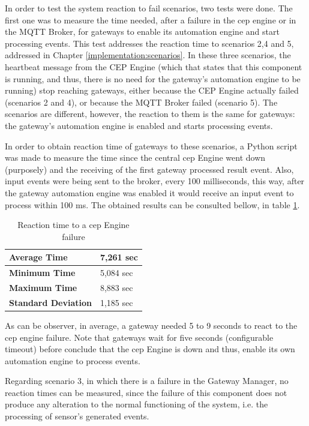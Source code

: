 In order to test the system reaction to fail scenarios, two tests were done. The first one was to measure the time needed, after a failure in the \ac{cep} engine or in the MQTT Broker, for gateways to enable its automation engine and start processing events. This test addresses the reaction time to scenarios 2,4 and 5, addressed in Chapter \ref{implementation:scenarios}. In these three scenarios, the heartbeat message from the CEP Engine (which that states that this component is running, and thus, there is no need for the gateway's automation engine to be running) stop reaching gateways, either because the CEP Engine actually failed (scenarios 2 and 4), or because the MQTT Broker failed (scenario 5). The scenarios are different, however, the reaction to them is the same for gateways: the gateway's automation engine is enabled and starts processing events. 


 In order to obtain reaction time of gateways to these scenarios, a Python script was made to measure the time since the central \ac{cep} Engine went down (purposely) and the receiving of the first gateway processed result event. Also, input events were being sent to the broker, every 100 milliseconds, this way, after the gateway automation engine was enabled it would receive an input event to process within 100 ms. The obtained results can be consulted bellow, in table \ref{cepDown}.


\begin{table}[H]
	
	\begin{tabular}{|l|l|}
		\hline
		\textbf{Average Time}       & 7,261 sec \\ \hline
		\textbf{Minimum Time}       &  5,084 sec \\ \hline
		\textbf{Maximum Time}       & 8,883 sec \\ \hline
		\textbf{Standard Deviation} & 1,185 sec \\ \hline
	\end{tabular}
	\centering
	\caption{Reaction time to a \ac{cep} Engine failure}
	\label{cepDown}
\end{table}

As can be observer, in average, a gateway needed 5 to 9 seconds to react to the \ac{cep} engine failure. Note that gateways wait for five seconds (configurable timeout) before conclude that the \ac{cep} Engine is down and thus, enable its own automation engine to process events.

Regarding scenario 3, in which there is a failure in the Gateway Manager, no reaction times can be measured, since the failure of this component does not produce any alteration to the normal functioning of the system, i.e. the processing of sensor's generated events.


